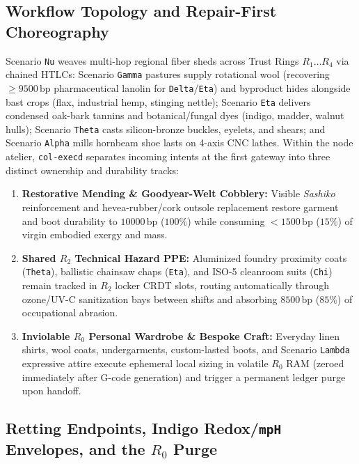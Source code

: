 \subsection{Workflow Topology and Repair-First Choreography}

Scenario \texttt{Nu} weaves multi-hop regional fiber sheds across Trust Rings $R_1 \dots R_4$ via chained HTLCs: Scenario \texttt{Gamma} pastures
supply rotational wool (recovering $\ge 9500\,\mathrm{bp}$ pharmaceutical lanolin for \texttt{Delta}/\texttt{Eta}) and byproduct hides alongside
bast crops (flax, industrial hemp, stinging nettle); Scenario \texttt{Eta} delivers condensed oak-bark tannins and botanical/fungal dyes (indigo,
madder, walnut hulls); Scenario \texttt{Theta} casts silicon-bronze buckles, eyelets, and shears; and Scenario \texttt{Alpha} mills hornbeam shoe
lasts on 4-axis CNC lathes. Within the node atelier, \texttt{col-execd} separates incoming intents at the first gateway into three distinct
ownership and durability tracks:
\begin{enumerate}
    \item \textbf{Restorative Mending \& Goodyear-Welt Cobblery:} Visible \emph{Sashiko} reinforcement and hevea-rubber/cork outsole replacement
    restore garment and boot durability to $10000\,\mathrm{bp}$ ($100\%$) while consuming $< 1500\,\mathrm{bp}$ ($15\%$) of virgin embodied
    exergy and mass.
    \item \textbf{Shared $R_2$ Technical Hazard PPE:} Aluminized foundry proximity coats (\texttt{Theta}), ballistic chainsaw chaps
    (\texttt{Eta}), and ISO-5 cleanroom suits (\texttt{Chi}) remain tracked in $R_2$ locker CRDT slots, routing automatically through ozone/UV-C
    sanitization bays between shifts and absorbing $8500\,\mathrm{bp}$ ($85\%$) of occupational abrasion.
    \item \textbf{Inviolable $R_0$ Personal Wardrobe \& Bespoke Craft:} Everyday linen shirts, wool coats, undergarments, custom-lasted boots,
    and Scenario \texttt{Lambda} expressive attire execute ephemeral local sizing in volatile $R_0$ RAM (zeroed immediately after G-code
    generation) and trigger a permanent ledger purge upon handoff.
\end{enumerate}

\subsection{Retting Endpoints, Indigo Redox/\texttt{mpH} Envelopes, and the $R_0$ Purge}


